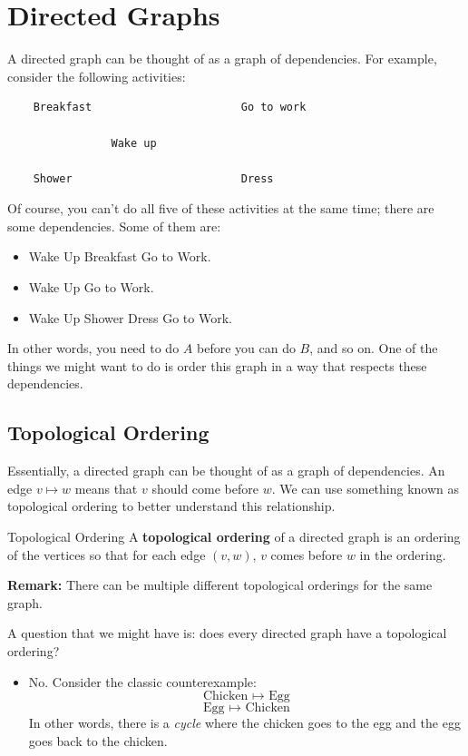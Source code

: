 \documentclass[letterpaper]{article}
\begin{document}
\section{Directed Graphs}
A directed graph can be thought of as a graph of dependencies. For example, consider the following activities:
\begin{verbatim}
    Breakfast                       Go to work

                Wake up 

    Shower                          Dress 
\end{verbatim}
Of course, you can't do all five of these activities at the same time; there are some dependencies. Some of them are: 
\begin{itemize}
    \item Wake Up \textrightarrow{} Breakfast \textrightarrow{} Go to Work. 
    \item Wake Up \textrightarrow{} Go to Work. 
    \item Wake Up \textrightarrow{} Shower \textrightarrow{} Dress \textrightarrow{} Go to Work. 
\end{itemize}
In other words, you need to do $A$ before you can do $B$, and so on. One of the things we might want to do is order this graph in a way that respects these dependencies.

\subsection{Topological Ordering}
Essentially, a directed graph can be thought of as a graph of dependencies. An edge $v \mapsto w$ means that $v$ should come before $w$. We can use something known as topological ordering to better understand this relationship.

\begin{definition}{Topological Ordering}{}
    A \textbf{topological ordering} of a directed graph is an ordering of the vertices so that for each edge $(v, w)$, $v$ comes before $w$ in the ordering.
\end{definition}
\textbf{Remark:} There can be multiple different topological orderings for the same graph.

\bigskip 

\noindent
A question that we might have is: does every directed graph have a topological ordering?
\begin{itemize}
    \item No. Consider the classic counterexample:
    \[\text{Chicken } \mapsto \text{ Egg}\]
    \[\text{Egg } \mapsto \text{ Chicken}\]
    In other words, there is a \emph{cycle} where the chicken goes to the egg and the egg goes back to the chicken. 
\end{itemize}
\end{document}
